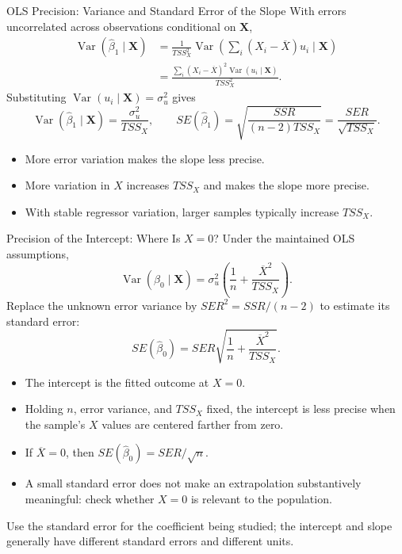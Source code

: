 \documentclass[10pt,aspectratio=169]{beamer}
\newcommand{\Var}{\operatorname{Var}}
\begin{document}
\begin{frame}{OLS Precision: Variance and Standard Error of the Slope}
\small
With errors uncorrelated across observations conditional on $\mathbf X$,
\begin{align*}
\Var(\widehat\beta_1\mid\mathbf X)
&=\frac{1}{TSS_X^2}\Var\!\left(\sum_i(X_i-\overline X)u_i\mid\mathbf X\right)\\
&=\frac{\sum_i(X_i-\overline X)^2\Var(u_i\mid\mathbf X)}{TSS_X^2}.
\end{align*}
Substituting $\Var(u_i\mid\mathbf X)=\sigma_u^2$ gives
\[
\Var(\widehat\beta_1\mid\mathbf X)=\frac{\sigma_u^2}{TSS_X},
\qquad
\boxed{SE(\widehat\beta_1)=\sqrt{\frac{SSR}{(n-2)TSS_X}}
=\frac{SER}{\sqrt{TSS_X}}}.
\]
\begin{itemize}
\item More error variation makes the slope less precise.
\item More variation in $X$ increases $TSS_X$ and makes the slope more precise.
\item With stable regressor variation, larger samples typically increase $TSS_X$.
\end{itemize}
\end{frame}

\begin{frame}{Precision of the Intercept: Where Is $X=0$?}
\small
Under the maintained OLS assumptions,
\[
\Var(\widehat\beta_0\mid\mathbf X)
=\sigma_u^2\left(\frac1n+\frac{\overline X^2}{TSS_X}\right).
\]
Replace the unknown error variance by $SER^2=SSR/(n-2)$ to estimate its standard error:
\[
\boxed{SE(\widehat\beta_0)
=SER\sqrt{\frac1n+\frac{\overline X^2}{TSS_X}}}.
\]
\begin{itemize}
\item The intercept is the fitted outcome at $X=0$.
\item Holding $n$, error variance, and $TSS_X$ fixed, the intercept is less precise when the sample's $X$ values are centered farther from zero.
\item If $\overline X=0$, then $SE(\widehat\beta_0)=SER/\sqrt n$.
\item A small standard error does not make an extrapolation substantively meaningful: check whether $X=0$ is relevant to the population.
\end{itemize}
Use the standard error for the coefficient being studied; the intercept and slope generally have different standard errors and different units.
\end{frame}
\end{document}
